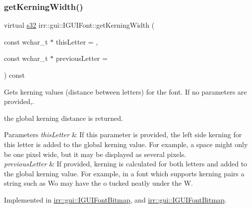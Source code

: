 \subsubsection{\texorpdfstring{get\+Kerning\+Width()}{getKerningWidth()}\hspace{0.1cm}{\footnotesize\ttfamily [2/2]}}
{\footnotesize\ttfamily virtual \hyperlink{namespaceirr_ac66849b7a6ed16e30ebede579f9b47c6}{s32} irr\+::gui\+::\+I\+G\+U\+I\+Font\+::get\+Kerning\+Width (\begin{DoxyParamCaption}\item[{const wchar\+\_\+t $\ast$}]{this\+Letter = {},  }\item[{const wchar\+\_\+t $\ast$}]{previous\+Letter = {} }\end{DoxyParamCaption}) const\hspace{0.3cm}{\ttfamily [pure virtual]}}



Gets kerning values (distance between letters) for the font. If no parameters are provided,. 

the global kerning distance is returned. 
\begin{DoxyParams}{Parameters}
{\em this\+Letter} & If this parameter is provided, the left side kerning for this letter is added to the global kerning value. For example, a space might only be one pixel wide, but it may be displayed as several pixels. \\
\hline
{\em previous\+Letter} & If provided, kerning is calculated for both letters and added to the global kerning value. For example, in a font which supports kerning pairs a string such as \textquotesingle{}Wo\textquotesingle{} may have the \textquotesingle{}o\textquotesingle{} tucked neatly under the \textquotesingle{}W\textquotesingle{}. \\
\hline
\end{DoxyParams}


Implemented in \hyperlink{classirr_1_1gui_1_1IGUIFontBitmap_a7bdeaea45745a10e09f7769ec3b95a12}{irr\+::gui\+::\+I\+G\+U\+I\+Font\+Bitmap}, and \hyperlink{classirr_1_1gui_1_1IGUIFontBitmap_a7bdeaea45745a10e09f7769ec3b95a12}{irr\+::gui\+::\+I\+G\+U\+I\+Font\+Bitmap}.

\mbox{\label{classirr_1_1gui_1_1IGUIFont_acff05412dc954845add611c5f71cef49}} 
